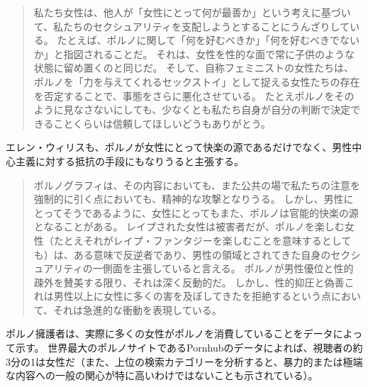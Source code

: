 \documentclass[paper=a4,book,openany]{jlreq} \usepackage{mystyle}
\begin{document}
\begin{quote}
私たち女性は、他人が「女性にとって何が最善か」という考えに基づいて、私たちのセクシュアリティを支配しようとすることにうんざりしている。
たとえば、ポルノに関して「何を好むべきか」「何を好むべきでないか」と指図されることだ。
それは、女性を性的な面で常に子供のような状態に留め置くのと同じだ。
そして、自称フェミニストの女性たちは、ポルノを「力を与えてくれるセックストイ」として捉える女性たちの存在を否定することで、事態をさらに悪化させている。
たとえポルノをそのように見なさないにしても、少なくとも私たち自身が自分の判断で決定できることくらいは信頼してほしい{\DDASH}どうもありがとう。
\citep{clark-flory10}
\end{quote}

エレン・ウィリスも、ポルノが女性にとって快楽の源であるだけでなく、男性中心主義に対する抵抗の手段にもなりうると主張する。

\begin{quote}
ポルノグラフィは、その内容においても、また公共の場で私たちの注意を強制的に引く点においても、精神的な攻撃となりうる。
しかし、男性にとってそうであるように、女性にとってもまた、ポルノは官能的快楽の源となることがある。
レイプされた女性は被害者だが、ポルノを楽しむ女性（たとえそれがレイプ・ファンタジーを楽しむことを意味するとしても）は、ある意味で反逆者であり、男性の領域とされてきた自身のセクシュアリティの一側面を主張していると言える。
ポルノが男性優位と性的疎外を賛美する限り、それは深く反動的だ。
しかし、性的抑圧と偽善{\DDASH}これは男性以上に女性に多くの害を及ぼしてきた{\DDASH}を拒絶するという点において、それは急進的な衝動を表現している。
\citep[pp.83-84]{willis84:_femin_moral_pornog}
\end{quote}

ポルノ擁護者は、実際に多くの女性がポルノを消費していることをデータによって示す。
世界最大のポルノサイトであるPornhubのデータによれば、視聴者の約3分の1は女性だ（また、上位の検索カテゴリーを分析すると、暴力的または極端な内容への一般の関心が特に高いわけではないことも示されている）\citep{insights19:_year_review}。
\end{document}
